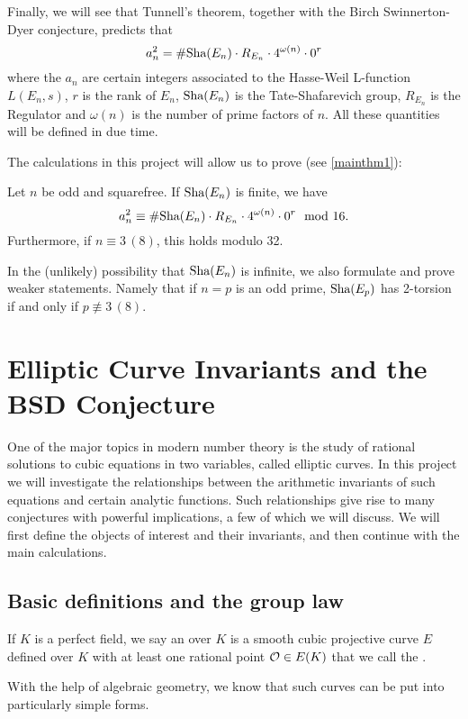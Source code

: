 \documentclass[12pt, a4paper]{report}
\begin{document}
Finally, we will see that Tunnell's theorem, together with the Birch Swinnerton-Dyer
conjecture, predicts that
\begin{equation} \label{eq:prediction}
  a_n^2 = \# \text{\normalfont Sha}(E_n) \cdot R_{E_n} \cdot 4^{\omega(n)} \cdot 0^r
\end{equation}
where the $a_n$ are certain integers associated to the Hasse-Weil L-function
$L(E_n,s)$, $r$ is the rank of $E_n$,
$\text{\normalfont Sha}(E_n)$ is the Tate-Shafarevich group,
$R_{E_n}$ is the Regulator and $\omega(n)$ is the number of prime factors of
$n$. All these quantities will be defined in due time. 

The calculations in this project will allow us to prove (see \autoref{mainthm1}): 
\begin{thm*}
  Let $n$ be odd and squarefree. If $\text{\normalfont Sha}(E_n)$ is finite, we have
  \[a^2_n \equiv \# \text{\normalfont Sha}(E_n) \cdot R_{E_n} \cdot 4^{\omega(n)} \cdot 0^r \mod{16}.\]
  Furthermore, if $n \equiv 3 \, (8)$, this holds modulo 32.
\end{thm*}
In the (unlikely) possibility that $\text{\normalfont Sha}(E_n)$ is infinite, we also formulate
and prove weaker statements. Namely that if $n = p$ is an odd prime,
$\text{\normalfont Sha}(E_p)$ has 2-torsion if and only if $p \not\equiv 3 \, (8).$


\chapter{Elliptic Curve Invariants and the BSD Conjecture}

One of the major topics in modern number theory is the study of rational
solutions to cubic equations in two variables, called elliptic curves.
In this project we will
investigate the relationships between the arithmetic invariants of such
equations and certain analytic functions. Such relationships give rise to
many conjectures with powerful implications, a few of which we will discuss.
We will first define the objects of interest and their invariants, and then
continue with the main calculations.

\section{Basic definitions and the group law}

\begin{defn}
  If $K$ is a perfect field,
  we say an  over $K$ is a smooth cubic projective
  curve $E$ defined over $K$ with at least one rational point ${\mathcal O} \in E(K)$
  that we call the .
\end{defn}
With the help of algebraic geometry, we know that such curves can be put
into particularly simple forms.
\end{document}
